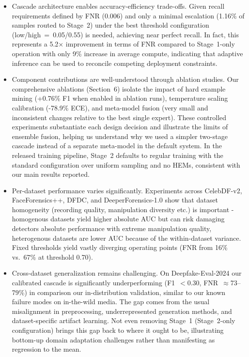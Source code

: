 \begin{itemize}[leftmargin=*,itemsep=2pt,parsep=0pt]
  \item Cascade architecture enables accuracy\hyp efficiency trade\hyp offs. Given recall requirements defined by FNR (\num{0.006}) and only a minimal escalation (\num{1.16}\% of samples routed to Stage~2) under the best threshold configuration (low/high~=~0.05/0.55) is needed, achieving near perfect recall. In fact, this represents a 5.2× improvement in terms of FNR compared to Stage~1\hyp only operation with only 9\% increase in average compute, indicating that adaptive inference can be used to reconcile competing deployment constraints.

  \item Component contributions are well\hyp understood through ablation studies. Our comprehensive ablations (Section~6) isolate the impact of hard example mining (+0.76\% F1 when enabled in ablation runs), temperature scaling calibration (-78.9\% ECE), and meta\hyp model fusion (very small and inconsistent changes relative to the best single expert). These controlled experiments substantiate each design decision and illustrate the limits of ensemble fusion, helping us understand why we used a simpler two\hyp stage cascade instead of a separate meta\hyp model in the default system. In the released training pipeline, Stage~2 defaults to regular training with the standard configuration over uniform sampling and no HEMs, consistent with our main results reported.

  \item Per\hyp dataset performance varies significantly. Experiments across CelebDF\hyp v2, FaceForensics++, DFDC, and DeeperForensics\hyp 1.0 show that dataset homogeneity (recording quality, manipulation diversity etc.) is important - homogenous datasets yield higher absolute AUC but can risk damaging detectors absolute performance with extreme manipulation quality, heterogenous datasets are lower AUC because of the within\hyp dataset variance. Fixed thresholds yield vastly diverging operating points (FNR from 16\% vs.\ 67\% at threshold 0.70).

  \item Cross\hyp dataset generalization remains challenging. On Deepfake\hyp Eval\hyp 2024 our calibrated cascade is significantly underperforming (F1~$<$0.30, FNR~$\approx$73--79\%) in comparison our in\hyp distribution validation, similar to our known failure modes on in\hyp the\hyp wild media. The gap comes from the usual misalignment in preprocessing, underrepresented generation methods, and dataset\hyp specific artifact learning. Not even removing Stage~1 (Stage~2\hyp only configuration) brings this gap back to where it ought to be, illustrating bottom\hyp up domain adaptation challenges rather than manifesting as regression to the mean.


\end{itemize}
